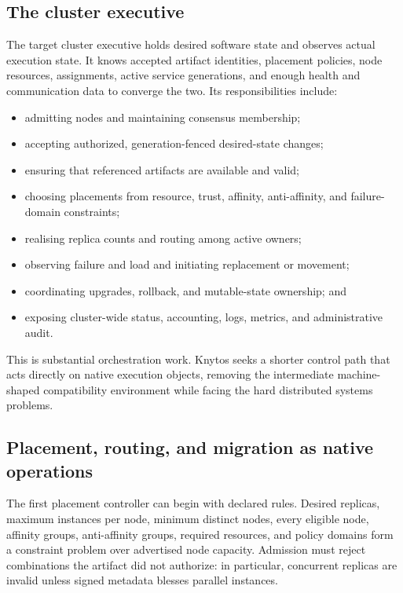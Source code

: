 \subsection{The cluster executive}

The target cluster executive holds desired software state and observes
actual execution state. It knows accepted artifact identities, placement
policies, node resources, assignments, active service generations, and
enough health and communication data to converge the two. Its responsibilities
include:

\begin{itemize}
    \item admitting nodes and maintaining consensus membership;
    \item accepting authorized, generation-fenced desired-state changes;
    \item ensuring that referenced artifacts are available and valid;
    \item choosing placements from resource, trust, affinity,
        anti-affinity, and failure-domain constraints;
    \item realising replica counts and routing among active owners;
    \item observing failure and load and initiating replacement or movement;
    \item coordinating upgrades, rollback, and mutable-state ownership; and
    \item exposing cluster-wide status, accounting, logs, metrics, and
        administrative audit.
\end{itemize}

This is substantial orchestration work. Knytos seeks a shorter control
path that acts directly on native execution objects, removing the intermediate
machine-shaped compatibility environment while facing the hard distributed
systems problems.

\subsection{Placement, routing, and migration as native operations}

The first placement controller can begin with declared rules. Desired
replicas, maximum instances per node, minimum distinct nodes, every eligible
node, affinity groups, anti-affinity groups, required resources, and policy
domains form a constraint problem over advertised node capacity. Admission
must reject combinations the artifact did not authorize: in particular,
concurrent replicas are invalid unless signed metadata blesses parallel
instances.

